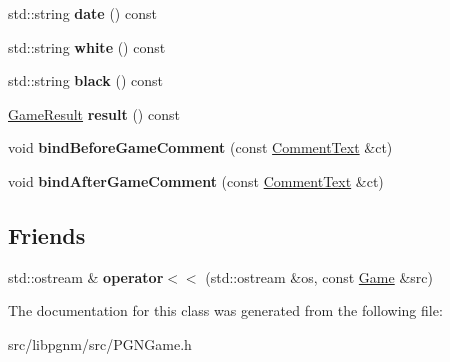 \begin{DoxyCompactItemize}
\item 
\hypertarget{classpgn_1_1Game_ad1da6be6fcaa426c8e2232680b4c0a97}{
std::string {\bfseries date} () const }
\label{classpgn_1_1Game_ad1da6be6fcaa426c8e2232680b4c0a97}

\item 
\hypertarget{classpgn_1_1Game_a20dd691b942f9d6869c7d538936475e2}{
std::string {\bfseries white} () const }
\label{classpgn_1_1Game_a20dd691b942f9d6869c7d538936475e2}

\item 
\hypertarget{classpgn_1_1Game_a06e6c7feadcac154ee59bcde7deb01f8}{
std::string {\bfseries black} () const }
\label{classpgn_1_1Game_a06e6c7feadcac154ee59bcde7deb01f8}

\item 
\hypertarget{classpgn_1_1Game_ad46a700f9803ed86e10f29d5e910301d}{
\hyperlink{classpgn_1_1GameResult}{GameResult} {\bfseries result} () const }
\label{classpgn_1_1Game_ad46a700f9803ed86e10f29d5e910301d}

\item 
\hypertarget{classpgn_1_1Game_a8da886b2b21bc51540a1205a311e04a8}{
void {\bfseries bindBeforeGameComment} (const \hyperlink{classpgn_1_1CommentText}{CommentText} \&ct)}
\label{classpgn_1_1Game_a8da886b2b21bc51540a1205a311e04a8}

\item 
\hypertarget{classpgn_1_1Game_a9251eab770f481daa1fcfc7c5cf35a6c}{
void {\bfseries bindAfterGameComment} (const \hyperlink{classpgn_1_1CommentText}{CommentText} \&ct)}
\label{classpgn_1_1Game_a9251eab770f481daa1fcfc7c5cf35a6c}

\end{DoxyCompactItemize}
\subsection*{Friends}
\begin{DoxyCompactItemize}
\item 
\hypertarget{classpgn_1_1Game_af78a70a5edc650cf984497f54bc63590}{
std::ostream \& {\bfseries operator$<$$<$} (std::ostream \&os, const \hyperlink{classpgn_1_1Game}{Game} \&src)}
\label{classpgn_1_1Game_af78a70a5edc650cf984497f54bc63590}

\end{DoxyCompactItemize}


The documentation for this class was generated from the following file:\begin{DoxyCompactItemize}
\item 
src/libpgnm/src/PGNGame.h\end{DoxyCompactItemize}
